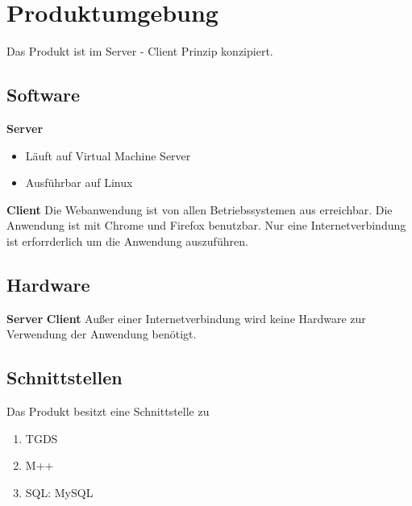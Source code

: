\chapter{Produktumgebung}
Das Produkt ist im Server - Client Prinzip konzipiert.

\section{Software}
\textbf{Server}
\begin{itemize}
    \item Läuft auf Virtual Machine Server
    \item Ausführbar auf Linux
\end{itemize}
\textbf{Client} Die Webanwendung ist von allen Betriebssystemen aus erreichbar. Die Anwendung ist mit Chrome und Firefox benutzbar. Nur eine Internetverbindung ist erforrderlich um die Anwendung auszuführen.
\section{Hardware}
\textbf{Server}
\textbf{Client}
Außer einer Internetverbindung wird keine Hardware zur Verwendung der Anwendung benötigt.
\section{Schnittstellen}
\renewcommand{\labelenumi}{/S\arabic{enumi}0/}
Das Produkt besitzt eine Schnittstelle zu
\begin{enumerate}
    \setlength\itemsep{-1em}
    \item TGDS
    \item M++
    \item SQL: MySQL
\end{enumerate}
